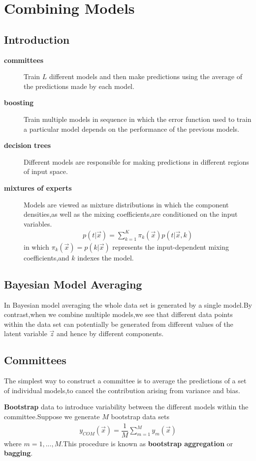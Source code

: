 \chapter{Combining Models}
\section{Introduction}
\begin{description}
	\item[\textbf{committees}] Train $L$ different models and then make predictions using the average of the predictions made by each model.
	\item[\textbf{boosting}] Train multiple models in sequence in which the error function used to train a particular model depends on the performance of the previous models.
	\item[\textbf{decision trees}] Different models are responsible for making predictions in different regions of input space.
	\item[\textbf{mixtures of experts}] Models are viewed as mixture distributions in which the component densities,as well as the mixing coefficients,are conditioned on the input variables.
	\begin{align}
	p(t|\vec{x})=\sum\limits_{k=1}^{K}\pi_k(\vec{x})p(t|\vec{x},k)
	\end{align}
	in which $\pi_k(\vec{x})=p(k|\vec{x})$ represents the input-dependent mixing coefficients,and $k$ indexes the model.
\end{description}

\section{Bayesian Model Averaging}
In Bayesian model averaging the whole data set is generated by a single model.By contrast,when we combine multiple models,we see that different data points within the data set can potentially be generated from different values of the latent variable $\vec{z}$ and hence by different components.

\section{Committees}
The simplest way to construct a committee is to average the predictions of a set of individual models,to cancel the contribution arising from variance and bias.

\textbf{Bootstrap} data to introduce variability between the different models within the committee.Suppose we generate $M$ bootstrap data sets
\begin{align}
y_{COM}(\vec{x})=\dfrac{1}{M}\sum\limits_{m=1}^{M}y_m(\vec{x})
\end{align}
where $m=1,...,M$.This procedure is known as \textbf{bootstrap aggregation} or \textbf{bagging}.

